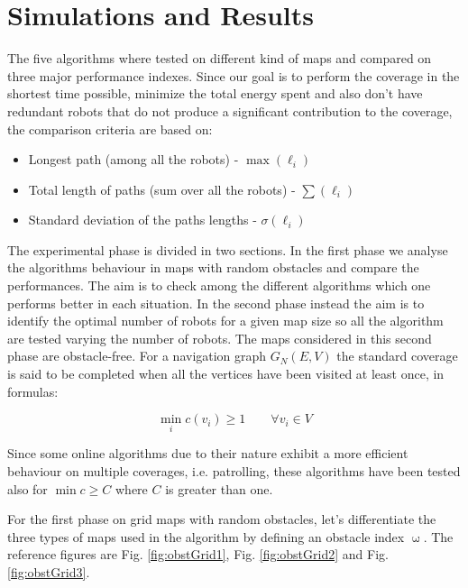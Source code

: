 \chapter{Simulations and Results}

The five algorithms where tested on different kind of maps and compared on three major performance indexes. Since our goal is to perform the coverage in the shortest time possible, minimize the total energy spent and also don't have redundant robots that do not produce a significant contribution to the coverage, the comparison criteria are based on:
\begin{itemize}
\item  Longest path (among all the robots) - $\max(\ell_i)$
\item  Total length of paths (sum over all the robots) -  $\sum(\ell_i)$
\item  Standard deviation of the paths lengths - $\sigma(\ell_i)$
\end{itemize}

The experimental phase is divided in two sections. In the first phase we analyse the algorithms behaviour in maps with random obstacles and compare the performances. The aim is to check among the different algorithms which one performs better in each situation. In the second phase instead the aim is to identify the optimal number of robots for a given map size so all the algorithm are tested varying the number of robots. The maps considered in this second phase are obstacle-free.
For a navigation graph $G_N(E,V)$ the standard coverage is said to be completed when all the vertices have been visited at least once, in formulas:

\begin{equation}
\min_i c(v_i) \geqslant 1 \qquad \forall v_i \in V
\end{equation}

Since some online algorithms due to their nature exhibit a more efficient behaviour on multiple coverages, i.e. patrolling, these algorithms have been tested also for $\min c \geqslant C$ where $C$ is greater than one.

For the first phase on grid maps with random obstacles, let's differentiate the three types of maps used in the algorithm by defining an obstacle index $\upomega$. The reference figures are Fig. \ref{fig:obstGrid1}, Fig. \ref{fig:obstGrid2} and Fig.\ref{fig:obstGrid3}.



